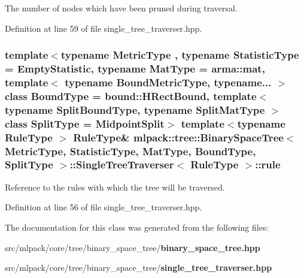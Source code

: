 The number of nodes which have been pruned during traversal. 



Definition at line 59 of file single\+\_\+tree\+\_\+traverser.\+hpp.

\subsubsection[{rule}]{\setlength{\rightskip}{0pt plus 5cm}template$<$typename Metric\+Type , typename Statistic\+Type  = Empty\+Statistic, typename Mat\+Type  = arma\+::mat, template$<$ typename Bound\+Metric\+Type, typename... $>$ class Bound\+Type = bound\+::\+H\+Rect\+Bound, template$<$ typename Split\+Bound\+Type, typename Split\+Mat\+Type $>$ class Split\+Type = Midpoint\+Split$>$ template$<$typename Rule\+Type $>$ Rule\+Type\& {\bf mlpack\+::tree\+::\+Binary\+Space\+Tree}$<$ Metric\+Type, Statistic\+Type, Mat\+Type, Bound\+Type, Split\+Type $>$\+::{\bf Single\+Tree\+Traverser}$<$ Rule\+Type $>$\+::rule\hspace{0.3cm}{\ttfamily [private]}}\label{classmlpack_1_1tree_1_1BinarySpaceTree_1_1SingleTreeTraverser_a514a09989ecc71843105924cf7106167}


Reference to the rules with which the tree will be traversed. 



Definition at line 56 of file single\+\_\+tree\+\_\+traverser.\+hpp.



The documentation for this class was generated from the following files\+:\begin{DoxyCompactItemize}
\item 
src/mlpack/core/tree/binary\+\_\+space\+\_\+tree/{\bf binary\+\_\+space\+\_\+tree.\+hpp}\item 
src/mlpack/core/tree/binary\+\_\+space\+\_\+tree/{\bf single\+\_\+tree\+\_\+traverser.\+hpp}\end{DoxyCompactItemize}
